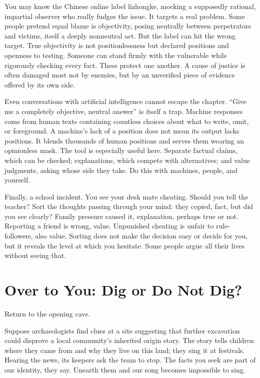 You may know the Chinese online label lizhongke, mocking a supposedly rational, impartial observer who really fudges the issue. It targets a real problem. Some people pretend equal blame is objectivity, posing neutrally between perpetrators and victims, itself a deeply nonneutral act. But the label can hit the wrong target. True objectivity is not positionlessness but declared positions and openness to testing. Someone can stand firmly with the vulnerable while rigorously checking every fact. These protect one another. A cause of justice is often damaged most not by enemies, but by an unverified piece of evidence offered by its own side.

Even conversations with artificial intelligence cannot escape the chapter. ``Give me a completely objective, neutral answer'' is itself a trap. Machine responses come from human texts containing countless choices about what to write, omit, or foreground. A machine's lack of a position does not mean its output lacks positions. It blends thousands of human positions and serves them wearing an opinionless mask. The tool is especially useful here. Separate factual claims, which can be checked; explanations, which compete with alternatives; and value judgments, asking whose side they take. Do this with machines, people, and yourself.

Finally, a school incident. You see your desk mate cheating. Should you tell the teacher? Sort the thoughts passing through your mind: they copied, fact, but did you see clearly? Family pressure caused it, explanation, perhaps true or not. Reporting a friend is wrong, value. Unpunished cheating is unfair to rule-followers, also value. Sorting does not make the decision easy or decide for you, but it reveals the level at which you hesitate. Some people argue all their lives without seeing that.

\section{Over to You: Dig or Do Not Dig?}
Return to the opening cave.

Suppose archaeologists find clues at a site suggesting that further excavation could disprove a local community's inherited origin story. The story tells children where they came from and why they live on this land; they sing it at festivals. Hearing the news, its keepers ask the team to stop. The facts you seek are part of our identity, they say. Unearth them and our song becomes impossible to sing.

